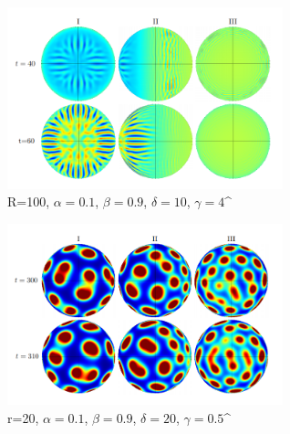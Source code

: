 \documentclass{beamer}
\begin{document}
            \begin{frame}{\insertsubsectionhead}
            
                \begin{figure}
                    \centering
                    \includegraphics[width=8cm, frame]{Images/sol01.png}
                    \caption{R=100, $\alpha=0.1$, $\beta=0.9$, $\delta=10$, $\gamma=4$^\cite{Krause2018}}
                \end{figure}
            
            \end{frame}
            
            \begin{frame}{\insertsubsectionhead}
            
                \begin{figure}
                    \centering
                    \includegraphics[width=8cm, frame]{Images/sol02.png}
                    \caption{r=20, $\alpha=0.1$, $\beta=0.9$, $\delta=20$, $\gamma=0.5$^\cite{Krause2018}}
                \end{figure}
            
            \end{frame}
            
\end{document}

